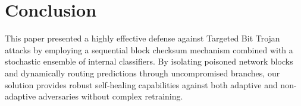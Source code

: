 \documentclass[conference]{IEEEtran}
\begin{document}

\section{Conclusion}
This paper presented a highly effective defense against Targeted Bit Trojan attacks by employing a sequential block checksum mechanism combined with a stochastic ensemble of internal classifiers. By isolating poisoned network blocks and dynamically routing predictions through uncompromised branches, our solution provides robust self-healing capabilities against both adaptive and non-adaptive adversaries without complex retraining. 
\end{document}
